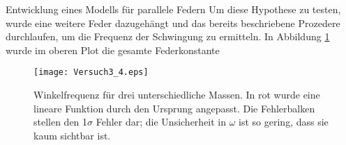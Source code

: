 \documentclass{alex_gp}
\begin{document}
\begin{mybox}{Entwicklung eines Modells für parallele Federn}
	Um diese Hypothese zu testen, wurde eine weitere Feder dazugehängt und das bereits beschriebene Prozedere durchlaufen, um die Frequenz der Schwingung zu ermitteln. In Abbildung \ref{fig:k2} wurde im oberen Plot die gesamte Federkonstante
	
	\begin{figure}[H]
		\centering
		\texttt{[image: Versuch3\_4.eps]}
		\caption{Winkelfrequenz für drei unterschiedliche Massen. In rot wurde eine lineare Funktion durch den Ursprung angepasst. Die Fehlerbalken stellen den 1$\sigma$ Fehler dar; die Unsicherheit in \( \omega \) ist so gering, dass sie kaum sichtbar ist.}
		\label{fig:k2}
	\end{figure}
	
	
\end{mybox}
\end{document}
